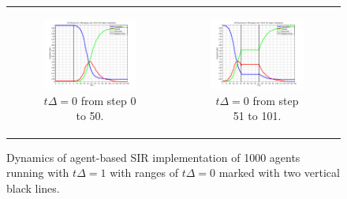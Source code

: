 \begin{figure}
\begin{center}
	\begin{tabular}{c c}
		\begin{subfigure}[b]{0.5\textwidth}
			\centering
			\includegraphics[width=.8\textwidth, angle=0]{./../shared/fig/dtzero/SIR_ABS_zeroDt_start.png}
			\caption{$t\Delta = 0$ from step 0 to 50.}
			\label{fig:sd_plot_10dt}
		\end{subfigure}
	
		& 
		
		\begin{subfigure}[b]{0.5\textwidth}
			\centering
			\includegraphics[width=.8\textwidth, angle=0]{./../shared/fig/dtzero/SIR_ABS_zeroDt_mid.png}
			\caption{$t\Delta = 0$ from step 51 to 101.}
			\label{fig:sd_plot_0.01dt}
		\end{subfigure}
	\end{tabular}
	
	\caption{Dynamics of agent-based SIR implementation of 1000 agents running with $t\Delta = 1$ with ranges of $t\Delta = 0$ marked with two vertical black lines.}
	\label{fig:sir_abs_zero_dt}
\end{center}
\end{figure}

